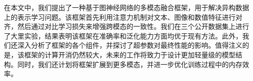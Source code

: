 在本文中，我们提出了一种基于图神经网络的多模态融合框架，用于解决异构数据上的表示学习问题。该框架首先利用注意力机制对文本、图像和数值特征进行对齐，然后通过对比学习损失来增强跨模态的一致性。我们在三个公开数据集上进行了大里实验，结果表明该框架在准确率和泛化能力方面均优于现有方法。此外，我们还深入分析了框架的各个组件，并探讨了超参数对最终性能的影响。值得注义的是，该框架的计算开消仍然较大，未来的工作将致力于设计更加轻量级的模型结构。同时，我们还计划将框架扩展到更多模态，并进一步优化训练过程中的内存效率。
